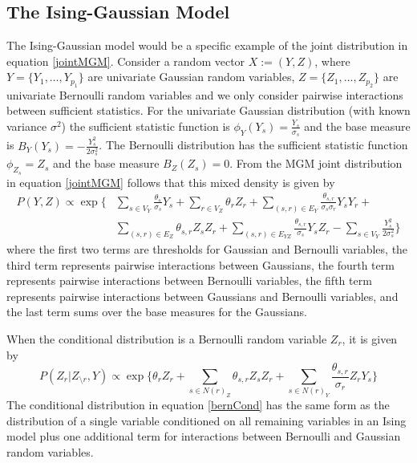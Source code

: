 \subsection{The Ising-Gaussian Model}
The Ising-Gaussian model would be a specific example of the joint distribution in equation \ref{jointMGM}. Consider a random vector $X := (Y,Z)$, where $Y = \{Y_1,\ldots,Y_{p_1}\}$ are univariate Gaussian random variables, $Z = \{Z_1,\ldots,Z_{p_2}\}$ are univariate Bernoulli random variables and we only consider pairwise interactions between sufficient statistics. For the univariate Gaussian distribution (with known variance $\sigma^2$) the sufficient statistic function is $\phi_Y (Y_s) = \frac{Y_s}{\sigma_s}$ and the base measure is $B_Y (Y_s) = -\frac{Y_{s}^2}{2\sigma_{s}^2}$. The Bernoulli distribution has the sufficient statistic function $\phi_{Z_s} = Z_s$ and the base measure $B_Z(Z_s)=0$. From the MGM joint distribution in equation \ref{jointMGM} follows that this mixed density is given by
\begin{equation} \label{jointIG}
    \begin{split}
        P(Y,Z) \propto \exp\Bigg\{&\sum_{s \in V_Y} \frac{\theta_s}{\sigma_s} Y_s + \sum_{r \in V_Z} \theta_r Z_r + \sum_{(s,r) \in E_Y} \frac{\theta_{s,r}}{\sigma_s\sigma_r} Y_s Y_r + \\
        &\sum_{(s,r) \in E_Z} \theta_{s,r} Z_s Z_r + \sum_{(s,r) \in E_{Y Z}} \frac{\theta_{s,r}}{\sigma_s} Y_s Z_r - \sum_{s \in V_Y} \frac{Y_{s}^2}{2\sigma_{s}^2} \Bigg\}
    \end{split}
\end{equation}
where the first two terms are thresholds for Gaussian and Bernoulli variables, the third term represents pairwise interactions between Gaussians, the fourth term represents pairwise interactions between Bernoulli variables, the fifth term represents pairwise interactions between Gaussians and Bernoulli variables, and the last term sums over the base measures for the Gaussians.

When the conditional distribution is a Bernoulli random variable $Z_r$, it is given by
\begin{equation} \label{bernCond}
    P(Z_r|Z_{\setminus r},Y) \propto \exp \Bigg\{\theta_r Z_r + \sum_{s \in N(r)_{Z}} \theta_{s,r} Z_s Z_r + \sum_{s \in N(r)_{Y}} \frac{\theta_{s,r}}{\sigma_r} Z_r Y_s \Bigg\}
\end{equation}
The conditional distribution in equation \ref{bernCond} has the same form as the distribution of a single variable conditioned on all remaining variables in an Ising model plus one additional term for interactions between Bernoulli and Gaussian random variables.

